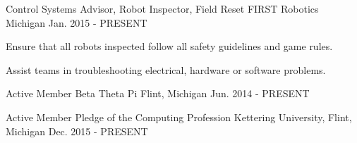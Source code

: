

\begin{cventries}


  \cventry
    {Control Systems Advisor, Robot Inspector, Field Reset} %
    {FIRST Robotics} %
    {Michigan} %
    {Jan. 2015 - PRESENT} %
    {
      \begin{cvitems} %
        \item {Ensure that all robots inspected follow all safety guidelines and game rules.}
        \item {Assist teams in troubleshooting electrical, hardware or software problems.}
      \end{cvitems}
    }

  \cventry
    {Active Member} %
    {Beta Theta Pi} %
    {Flint, Michigan} %
    {Jun. 2014 - PRESENT} %
    {
      \begin{cvitems} %
      \end{cvitems}
    }

  \cventry
    {Active Member} %
    {Pledge of the Computing Profession} %
    {Kettering University, Flint, Michigan} %
    {Dec. 2015 - PRESENT} %
    {
      \begin{cvitems} %
      \end{cvitems}
    }


\end{cventries}
